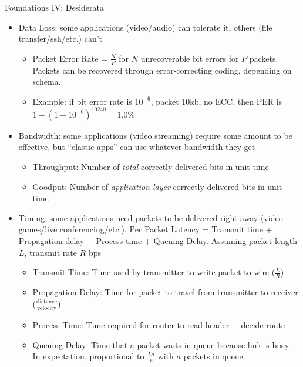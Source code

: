 \documentclass{beamer}
\begin{document}
\begin{frame}[t]{Foundations IV: Desiderata}
    \begin{itemize}
        \item \alert{Data Loss}: some applications (video/audio) can tolerate it, others (file transfer/ssh/etc.) can't
        \begin{itemize}
            \item \pause \alert{Packet Error Rate} = $\frac{N}{P}$ for $N$ unrecoverable bit errors for $P$ packets. Packets can be recovered through error-correcting coding, depending on schema. 
            \item \pause Example: if bit error rate is $10^{-6}$, packet 10kb, no ECC, then PER is $1-(1-10^{-6})^{10240} = 1.0\%$
        \end{itemize}
        \item \pause \alert{Bandwidth}: some applications (video streaming) require some amount to be effective, but ``elastic apps'' can use whatever bandwidth they get
        \begin{itemize}
            \item \pause \alert{Throughput}: Number of \textit{total} correctly delivered bits in unit time
            \item \pause \alert{Goodput}: Number of \textit{application-layer} correctly delivered bits in unit time
        \end{itemize}
        \item \pause \alert{Timing}: some applications need packets to be delivered right away (video games/live conferencing/etc.). \alert{Per Packet Latency} = Transmit time + Propagation delay + Process time + Queuing Delay. Assuming packet length $L$, transmit rate $R$ bps
        \begin{itemize}
            \item \pause \alert{Transmit Time}: Time used by transmitter to write packet to wire ($\frac{L}{R}$)
            \item \pause \alert{Propagation Delay}: Time for packet to travel from transmitter to receiver ($\frac{\text{distance}}{\text{velocity}}$)
            \item \pause \alert{Process Time}: Time required for router to read header + decide route
            \item \pause \alert{Queuing Delay}: Time that a packet waits in queue because link is busy. In expectation, proportional to $\frac{La}{r}$ with $a$ packets in queue.
        \end{itemize}
    \end{itemize}
\end{frame}
\end{document}

